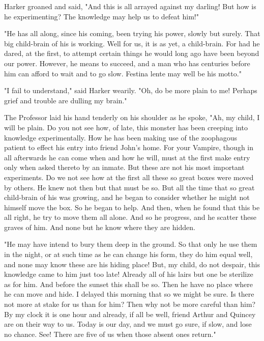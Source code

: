 Harker groaned and said, "And this is all arrayed against my darling! But how is he experimenting? The knowledge may help us to defeat him!" 

"He has all along, since his coming, been trying his power, slowly but surely. That big child-brain of his is working. Well for us, it is as yet, a child-brain. For had he dared, at the first, to attempt certain things he would long ago have been beyond our power. However, he means to succeed, and a man who has centuries before him can afford to wait and to go slow. Festina lente may well be his motto." 

"I fail to understand," said Harker wearily. "Oh, do be more plain to me! Perhaps grief and trouble are dulling my brain." 

The Professor laid his hand tenderly on his shoulder as he spoke, "Ah, my child, I will be plain. Do you not see how, of late, this monster has been creeping into knowledge experimentally. How he has been making use of the zoophagous patient to effect his entry into friend John's home. For your Vampire, though in all afterwards he can come when and how he will, must at the first make entry only when asked thereto by an inmate. But these are not his most important experiments. Do we not see how at the first all these so great boxes were moved by others. He knew not then but that must be so. But all the time that so great child-brain of his was growing, and he began to consider whether he might not himself move the box. So he began to help. And then, when he found that this be all right, he try to move them all alone. And so he progress, and he scatter these graves of him. And none but he know where they are hidden. 

"He may have intend to bury them deep in the ground. So that only he use them in the night, or at such time as he can change his form, they do him equal well, and none may know these are his hiding place! But, my child, do not despair, this knowledge came to him just too late! Already all of his lairs but one be sterilize as for him. And before the sunset this shall be so. Then he have no place where he can move and hide. I delayed this morning that so we might be sure. Is there not more at stake for us than for him? Then why not be more careful than him? By my clock it is one hour and already, if all be well, friend Arthur and Quincey are on their way to us. Today is our day, and we must go sure, if slow, and lose no chance. See! There are five of us when those absent ones return." 

